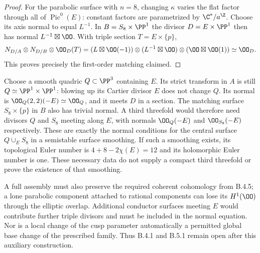 \begin{proof}
For the parabolic surface with $n=8$, changing $\kappa$ varies the
flat factor through all of $\operatorname{Pic}^0(E)$:
constant factors are parametrized by $\C^*/a^\Z$.
Choose its axis normal to equal $L^{-1}$.
In $B=S_8\times\PP^1$ the divisor $D=E\times\PP^1$ then has normal
$L^{-1}\boxtimes\OO$. With triple section $T=E\times\{p\}$,
\[
 N_{D/A}\otimes N_{D/B}\otimes\OO_D(T)
   =(L\boxtimes\OO(-1))\otimes
     (L^{-1}\boxtimes\OO)\otimes(\OO\boxtimes\OO(1))
   \simeq\OO_D.
\]
This proves precisely the first-order matching claimed.
\end{proof}

\begin{remark}
Choose a smooth quadric $Q\subset\PP^3$ containing $E$.
Its strict transform in $A$ is still $Q\simeq\PP^1\times\PP^1$:
blowing up its Cartier divisor $E$ does not change $Q$.
Its normal is
$\OO_Q(2,2)(-E)\simeq\OO_Q$, and it meets $D$ in a section.
The matching surface $S_8\times\{p\}$ in $B$ also has trivial
normal. A third threefold would therefore need divisors $Q$ and
$S_8$ meeting along $E$, with normals
$\OO_Q(-E)$ and $\OO_{S_8}(-E)$ respectively.
These are exactly the normal conditions for the central surface
$Q\cup_E S_8$ in a semistable surface smoothing.
If such a smoothing exists, its topological Euler number is
$4+8-2\chi(E)=12$ and its holomorphic Euler number is one.
These necessary data do not supply a compact third threefold or
prove the existence of that smoothing.

A full assembly must also preserve the required coherent cohomology
from B.4.5; a lone parabolic component attached to rational components
can lose its $H^1(\OO)$ through the elliptic overlap.
Additional conductor surfaces meeting $E$ would contribute further
triple divisors and must be included in the normal equation.
Nor is a local change of the cusp parameter automatically a permitted
global base change of the prescribed family.
Thus B.4.1 and B.5.1 remain open after this auxiliary construction.
\end{remark}
